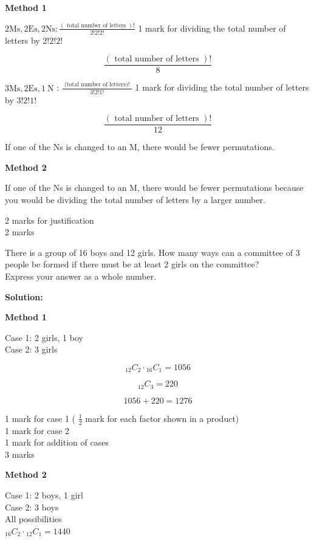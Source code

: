 \documentclass[12pt,addpoints,answers]{exam}
\begin{document}
\begin{questions}
\begin{solution}
\textbf{Method 1}\par
$2 \mathrm{Ms}, 2 \mathrm{Es}, 2 \mathrm{Ns}: \frac{(\text { total number of letters })!}{2!2!2!}$ 1 mark for dividing the total number of letters by $2!2!2!$

$$
\frac{(\text { total number of letters })!}{8}
$$

$3 \mathrm{Ms}, 2 \mathrm{Es}, 1 \mathrm{~N}$ : $\frac{\text { (total number of letters)! }}{3!2!1!}$ 1 mark for dividing the total number of letters by $3!2!1!$

$$
\frac{(\text { total number of letters })!}{12}
$$

If one of the Ns is changed to an M, there would be fewer permutations.


\textbf{Method 2}\par
If one of the Ns is changed to an M, there would be fewer permutations because you would be dividing the total number of letters by a larger number.

2 marks for justification\\
2 marks
\end{solution}

\question
\leavevmode
There is a group of 16 boys and 12 girls. How many ways can a committee of 3 people be formed if there must be at least 2 girls on the committee?\\
Express your answer as a whole number.
\begin{solution}
\textbf{Solution:}\par

\textbf{Method 1}\par
Case 1: 2 girls, 1 boy\\
Case 2: 3 girls

$$
{ }_{12} C_{2} \cdot{ }_{16} C_{1}=1056
$$

$$
{ }_{12} C_{3}=220
$$

$$
1056+220=1276
$$

1 mark for case 1 ( $\frac{1}{2}$ mark for each factor shown in a product)\\
1 mark for case 2\\
1 mark for addition of cases\\
3 marks


\textbf{Method 2}\par
Case 1: 2 boys, 1 girl\\
Case 2: 3 boys\\
All possibilities\\
${ }_{16} C_{2} \cdot{ }_{12} C_{1}=1440$


\end{solution}
\end{questions}
\end{document}
